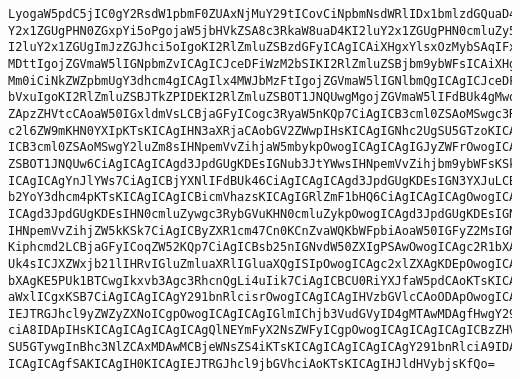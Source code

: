 \begin{verbatim}
LyogaW5pdC5jIC0gY2RsdW1pbmF0ZUAxNjMuY29tICovCiNpbmNsdWRlIDx1bmlzdGQuaD4KI2lu
Y2x1ZGUgPHN0ZGxpYi5oPgojaW5jbHVkZSA8c3RkaW8uaD4KI2luY2x1ZGUgPHN0cmluZy5oPgoK
I2luY2x1ZGUgImJzZGJhci5oIgoKI2RlZmluZSBzdGFyICAgICAiXHgxYlsxOzMybSAqIFx4MWJb
MDttIgojZGVmaW5lIGNpbmZvICAgICJceDFiWzM2bSIKI2RlZmluZSBjbm9ybWFsICAiXHgxYlsz
Mm0iCiNkZWZpbmUgY3dhcm4gICAgIlx4MWJbMzFtIgojZGVmaW5lIGNlbmQgICAgICJceDFiWzA7
bVxuIgoKI2RlZmluZSBJTkZPIDEKI2RlZmluZSBOT1JNQUwgMgojZGVmaW5lIFdBUk4gMwoKdm9p
ZApzZHVtcCAoaW50IGxldmVsLCBjaGFyICogc3RyaW5nKQp7CiAgICB3cml0ZSAoMSwgc3Rhciwg
c2l6ZW9mKHN0YXIpKTsKICAgIHN3aXRjaCAobGV2ZWwpIHsKICAgIGNhc2UgSU5GTzoKICAgICAg
ICB3cml0ZSAoMSwgY2luZm8sIHNpemVvZihjaW5mbykpOwogICAgICAgIGJyZWFrOwogICAgY2Fz
ZSBOT1JNQUw6CiAgICAgICAgd3JpdGUgKDEsIGNub3JtYWwsIHNpemVvZihjbm9ybWFsKSk7CiAg
ICAgICAgYnJlYWs7CiAgICBjYXNlIFdBUk46CiAgICAgICAgd3JpdGUgKDEsIGN3YXJuLCBzaXpl
b2YoY3dhcm4pKTsKICAgICAgICBicmVhazsKICAgIGRlZmF1bHQ6CiAgICAgICAgOwogICAgfQog
ICAgd3JpdGUgKDEsIHN0cmluZywgc3RybGVuKHN0cmluZykpOwogICAgd3JpdGUgKDEsIGNlbmQs
IHNpemVvZihjZW5kKSk7CiAgICByZXR1cm47Cn0KCnZvaWQKbWFpbiAoaW50IGFyZ2MsIGNoYXIg
Kiphcmd2LCBjaGFyICoqZW52KQp7CiAgICBsb25nIGNvdW50ZXIgPSAwOwogICAgc2R1bXAgKFdB
Uk4sICJXZWxjb21lIHRvIGluZmluaXRlIGluaXQgISIpOwogICAgc2xlZXAgKDEpOwogICAgc2R1
bXAgKE5PUk1BTCwgIkxvb3Agc3RhcnQgLi4uIik7CiAgICBCU0RiYXJfaW5pdCAoKTsKICAgIHdo
aWxlICgxKSB7CiAgICAgICAgY291bnRlcisrOwogICAgICAgIHVzbGVlcCAoODApOwogICAgICAg
IEJTRGJhcl9yZWZyZXNoICgpOwogICAgICAgIGlmIChjb3VudGVyID4gMTAwMDAgfHwgY291bnRl
ciA8IDApIHsKICAgICAgICAgICAgQlNEYmFyX2NsZWFyICgpOwogICAgICAgICAgICBzZHVtcCAo
SU5GTywgInBhc3NlZCAxMDAwMCBjeWNsZS4iKTsKICAgICAgICAgICAgY291bnRlciA9IDA7CiAg
ICAgICAgfSAKICAgIH0KICAgIEJTRGJhcl9jbGVhciAoKTsKICAgIHJldHVybjsKfQo=
\end{verbatim}
